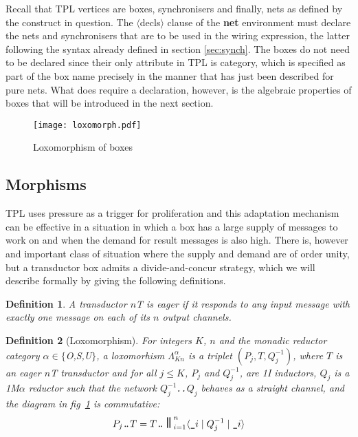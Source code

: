 \documentclass[11pt]{report}
\newtheorem*{mydef}{Definition}
\begin{document}
Recall that TPL vertices are boxes, synchronisers and finally, nets as defined by the construct in question. The $\langle$decls$\rangle$ clause of the {\bf net}
environment must declare the nets and synchronisers that are to be used in the wiring expression, the latter following the syntax already defined in section \ref{sec:synch}. The boxes do not need to be declared since their only attribute
in TPL is category, which is specified as part of the box name precisely in the manner that has just been described for pure nets. 
What does require a declaration, however, is the algebraic properties
of boxes that will be introduced in the next section.

\begin{figure}
\texttt{[image: loxomorph.pdf]}\\
\vspace{-2.5in}
\caption{Loxomorphism of boxes
\label{fig:loxo}}
\end{figure}
\subsection{Morphisms}
TPL uses pressure as a trigger for proliferation and this adaptation mechanism can be effective in a situation in which a box has a large supply of messages
to work on and when the demand for result messages is also high. There is, however and important class of situation where the supply and demand are of order unity,
but a transductor box admits a divide-and-concur strategy, which we will describe formally by giving the following definitions.
\begin{mydef}
A transductor $n${\rm T} is {\it eager} if it responds to any input message with exactly one message on each of its $n$ output channels.
\end{mydef}
\begin{mydef}[Loxomorphism]
For integers $K$, $n$ and the monadic reductor category $\alpha\in\{${\rm O,S,U}$\}$, a loxomorhism $\Lambda_{Kn}^\alpha$ is a triplet $(P_j, T, Q_j^{-1})$, where
$T$ is an eager $n${\rm T} transductor and
for all $j\le K$, $P_j$ and $Q^{-1}_j$, are {\rm 1I} inductors, $Q_j$ is a {\rm 1M$\alpha$} reductor such that the network $Q^{-1}_j${\tt .\kern-3pt.}$Q_j$ behaves
as a straight channel,  and the diagram in fig~\ref{fig:loxo} is commutative:
\[
P_j\hbox{\tt .\kern-3pt.}T = T\hbox{\tt .\kern-3pt.}\hbox{\Large\tt|\kern-5pt|}_{i=1}^n \langle\verb$_$i\mid Q^{-1}_j\mid \verb$_$i\rangle
\]
\end{mydef}
\end{document}
